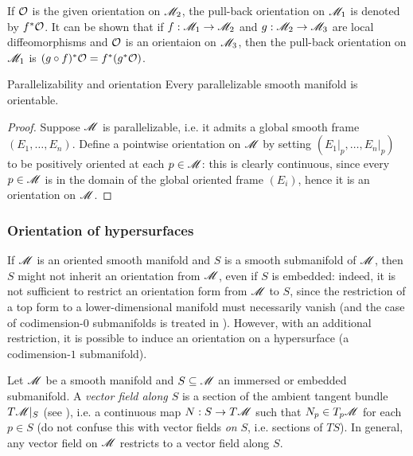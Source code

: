 If $ \mathcal{O} $ is the given orientation on $ \mathscr{M}_2 $, the pull-back orientation on $ \mathscr{M}_1 $ is denoted by $ f^* \mathcal{O} $. It can be shown that if $ f : \mathscr{M}_1 \rightarrow \mathscr{M}_2 $ and $ g : \mathscr{M}_2 \rightarrow \mathscr{M}_3 $ are local diffeomorphisms and $ \mathcal{O} $ is an orientaion on $ \mathscr{M}_3 $, then the pull-back orientation on $ \mathscr{M}_1 $ is $ (g \circ f)^* \mathcal{O} = f^*(g^* \mathcal{O}) $.

\begin{proposition}{Parallelizability and orientation}{}
  Every parallelizable smooth manifold is orientable.
\end{proposition}

\begin{proofbox}
  \begin{proof}
    Suppose $ \mathscr{M} $ is parallelizable, i.e. it admits a global smooth frame $ (E_1 , \dots , E_n) $. Define a pointwise orientation on $ \mathscr{M} $ by setting $ (E_1\vert_p , \dots , E_n\vert_p) $ to be positively oriented at each $ p \in \mathscr{M} $: this is clearly continuous, since every $ p \in \mathscr{M} $ is in the domain of the global oriented frame $ (E_i) $, hence it is an orientation on $ \mathscr{M} $.
  \end{proof}
\end{proofbox}

\subsubsection{Orientation of hypersurfaces}

If $ \mathscr{M} $ is an oriented smooth manifold and $ S $ is a smooth submanifold of $ \mathscr{M} $, then $ S $ might not inherit an orientation from $ \mathscr{M} $, even if $ S $ is embedded: indeed, it is not sufficient to restrict an orientation form from $ \mathscr{M} $ to $ S $, since the restriction of a top form to a lower-dimensional manifold must necessarily vanish (and the case of codimension-$ 0 $ submanifolds is treated in ). However, with an additional restriction, it is possible to induce an orientation on a hypersurface (a codimension-$ 1 $ submanifold).

Let $ \mathscr{M} $ be a smooth manifold and $ S \subseteq \mathscr{M} $ an immersed or embedded submanifold. A \emph{vector field along $ S $} is a section of the ambient tangent bundle $ T\mathscr{M} \vert_S $ (see ), i.e. a continuous map $ N : S \rightarrow T\mathscr{M} $ such that $ N_p \in T_p\mathscr{M} $ for each $ p \in S $ (do not confuse this with vector fields \emph{on} $ S $, i.e. sections of $ TS $). In general, any vector field on $ \mathscr{M} $ restricts to a vector field along $ S $.

